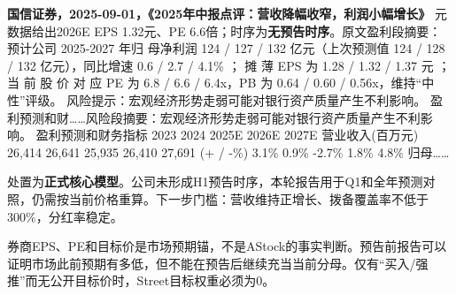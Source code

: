 \textbf{国信证券，2025-09-01，《2025年中报点评：营收降幅收窄，利润小幅增长》}
元数据给出2026E EPS 1.32元、PE 6.6倍；时序为\textbf{无预告时序}。原文盈利段摘要：预计公司 2025-2027 年归 母净利润 124 / 127 / 132 亿元（上次预测值 124 / 128 / 132 亿元），同比增速 0.6 / 2.7 / 4.1\% ； 摊 薄 EPS 为 1.28 / 1.32 / 1.37 元 ； 当 前 股 价 对 应 PE 为 6.8 / 6.6 / 6.4x，PB 为 0.64 / 0.60 / 0.56x，维持“中性”评级。 风险提示：宏观经济形势走弱可能对银行资产质量产生不利影响。 盈利预测和财……风险段摘要：宏观经济形势走弱可能对银行资产质量产生不利影响。 盈利预测和财务指标 2023 2024 2025E 2026E 2027E 营业收入(百万元) 26,414 26,641 25,935 26,410 27,691 (+ / -\%) 3.1\% 0.9\% -2.7\% 1.8\% 4.8\% 归母……

\begin{keyinsight}[AStock处理]
处置为\textbf{正式核心模型}。公司未形成H1预告时序，本轮报告用于Q1和全年预测对照，仍需按当前价格重算。下一步门槛：营收维持正增长、拨备覆盖率不低于300\%，分红率稳定。
\end{keyinsight}
\begin{riskbox}[研报使用边界]
券商EPS、PE和目标价是市场预期锚，不是AStock的事实判断。预告前报告可以证明市场此前预期有多低，但不能在预告后继续充当当前分母。仅有“买入/强推”而无公开目标价时，Street目标权重必须为0。
\end{riskbox}
